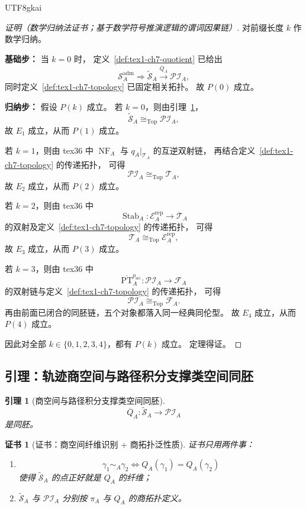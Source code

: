 \documentclass[12pt]{article}
\newtheorem{lemma}{引理}[section]
\newtheorem{Certificate}{证书}[section]
\begin{document}
\begin{CJK*}{UTF8}{gkai}
\begin{proof}[证明（数学归纳法证书；基于数学符号推演逻辑的谓词因果链）]
对前缀长度 \(k\) 作数学归纳。

\textbf{基础步：}
当 \(k=0\) 时，
定义~\ref{def:tex1-ch7-quotient} 已给出
\[
  \mathcal S_A^{\mathrm{adm}}
  \Longrightarrow
  \widetilde{\mathcal S}_A
  \xrightarrow{\overline Q_A}
  \mathcal{PI}_A,
\]
同时定义~\ref{def:tex1-ch7-topology} 已固定相关拓扑。
故 \(P(0)\) 成立。

\textbf{归纳步：}
假设 \(P(k)\) 成立。
若 \(k=0\)，则由引理~\ref{lem:tex1-ch7-qbar}，
\[
  \widetilde{\mathcal S}_A\cong_{\mathrm{Top}}\mathcal{PI}_A,
\]
故 \(E_1\) 成立，从而 \(P(1)\) 成立。

若 \(k=1\)，则由 tex36 中 \(\operatorname{NF}_A\) 与 \(q_A|_{\mathcal T_A}\) 的互逆双射链，
再结合定义~\ref{def:tex1-ch7-topology} 的传递拓扑，
可得
\[
  \mathcal{PI}_A\cong_{\mathrm{Top}}\mathcal T_A,
\]
故 \(E_2\) 成立，从而 \(P(2)\) 成立。

若 \(k=2\)，则由 tex36 中
\[
  \operatorname{Stab}_A:\mathcal E_A^{\mathrm{rep}}\to \mathcal T_A
\]
的双射及定义~\ref{def:tex1-ch7-topology} 的传递拓扑，
可得
\[
  \mathcal T_A\cong_{\mathrm{Top}}\mathcal E_A^{\mathrm{rep}},
\]
故 \(E_3\) 成立，从而 \(P(3)\) 成立。

若 \(k=3\)，则由 tex36 中
\[
  \overline{\mathrm{PT}}_A^{p_{\mathrm{src}}}:\mathcal{PI}_A\to\mathcal F_A
\]
的双射链与定义~\ref{def:tex1-ch7-topology} 的传递拓扑，
可得
\[
  \mathcal{PI}_A\cong_{\mathrm{Top}}\mathcal F_A.
\]
再由前面已闭合的同胚链，五个对象都落入同一经典同伦型。
故 \(E_4\) 成立，从而 \(P(4)\) 成立。

因此对全部 \(k\in\{0,1,2,3,4\}\)，都有 \(P(k)\) 成立。
定理得证。
\end{proof}

\subsection{引理：轨迹商空间与路径积分支撑类空间同胚}
\label{subsec:tex1-ch7-lemma}

\begin{lemma}[商空间与路径积分支撑类空间同胚]
\label{lem:tex1-ch7-qbar}
\[
  \overline Q_A:\widetilde{\mathcal S}_A\to \mathcal{PI}_A
\]
是同胚。
\end{lemma}

\begin{Certificate}[证书：商空间纤维识别 + 商拓扑泛性质]
\label{cert:tex1-ch7-qbar}
证书只用两件事：
\begin{enumerate}
  \item
  \[
    \gamma_1\sim_A\gamma_2
    \iff
    Q_A(\gamma_1)=Q_A(\gamma_2)
  \]
  使得 \(\widetilde{\mathcal S}_A\) 的点正好就是 \(Q_A\) 的纤维；
  \item \(\widetilde{\mathcal S}_A\) 与 \(\mathcal{PI}_A\) 分别按 \(\pi_A\) 与 \(Q_A\) 的商拓扑定义。
\end{enumerate}
\end{Certificate}


\end{CJK*}
\end{document}
